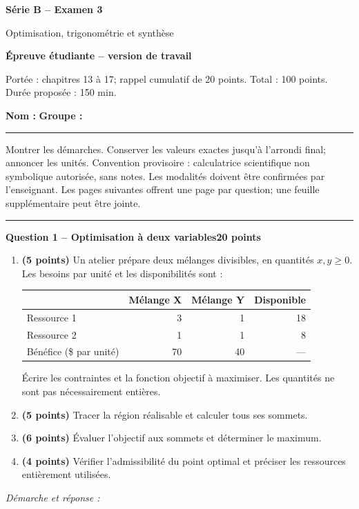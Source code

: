 \documentclass[11pt,a4paper]{article}
\begin{document}
{\LARGE\bfseries Série B -- Examen 3}\par
{\large Optimisation, trigonométrie et synthèse}\par
\textbf{Épreuve étudiante -- version de travail}\par
Portée : chapitres 13 à 17; rappel cumulatif de 20 points. Total : 100 points. Durée proposée : 150 min.\par
\textbf{Nom :} \hrulefill\quad \textbf{Groupe :} \rule{22mm}{0.3pt}\par
\small Montrer les démarches. Conserver les valeurs exactes jusqu’à l’arrondi final; annoncer les unités. Convention provisoire : calculatrice scientifique non symbolique autorisée, sans notes. Les modalités doivent être confirmées par l’enseignant. Les pages suivantes offrent une page par question; une feuille supplémentaire peut être jointe.\normalsize\par
\vspace{3mm}\hrule\vspace{4mm}
{\large\bfseries Question 1 -- Optimisation à deux variables}\hfill\textbf{20 points}\par
\begin{enumerate}
\item \textbf{(5 points)} Un atelier prépare deux mélanges divisibles, en quantités \(x,y\ge0\). Les besoins par unité et les disponibilités sont :
\begin{center}\begin{tabular}{lrrr}\toprule
& Mélange X & Mélange Y & Disponible\\\midrule
Ressource 1 & 3 & 1 & 18\\
Ressource 2 & 1 & 1 & 8\\
Bénéfice (\$ par unité) & 70 & 40 & ---\\\bottomrule
\end{tabular}\end{center}
Écrire les contraintes et la fonction objectif à maximiser. Les quantités ne sont pas nécessairement entières.
\item \textbf{(5 points)} Tracer la région réalisable et calculer tous ses sommets.
\item \textbf{(6 points)} Évaluer l’objectif aux sommets et déterminer le maximum.
\item \textbf{(4 points)} Vérifier l’admissibilité du point optimal et préciser les ressources entièrement utilisées.
\end{enumerate}
\vspace{3mm}\textit{Démarche et réponse :}\par\vfill
\end{document}
